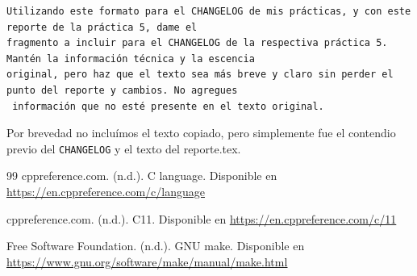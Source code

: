 \documentclass[12pt,letterpaper]{article}
\begin{document}
\begin{verbatim}
Utilizando este formato para el CHANGELOG de mis prácticas, y con este reporte de la práctica 5, dame el
fragmento a incluir para el CHANGELOG de la respectiva práctica 5. Mantén la información técnica y la escencia
original, pero haz que el texto sea más breve y claro sin perder el punto del reporte y cambios. No agregues
 información que no esté presente en el texto original.
\end{verbatim}

Por brevedad no incluímos el texto copiado, pero simplemente fue el contendio previo del \texttt{CHANGELOG} y el
texto del reporte.tex.
\begin{thebibliography}{99}
  cppreference.com. (n.d.). C language. Disponible en
  \textcolor{links}{\uline{\url{https://en.cppreference.com/c/language}}}

  cppreference.com. (n.d.). C11. Disponible en
  \textcolor{links}{\uline{\url{https://en.cppreference.com/c/11}}}

  Free Software Foundation. (n.d.). GNU make. Disponible en
  \textcolor{links}{\uline{\url{https://www.gnu.org/software/make/manual/make.html}}}
\end{thebibliography}
\end{document}
